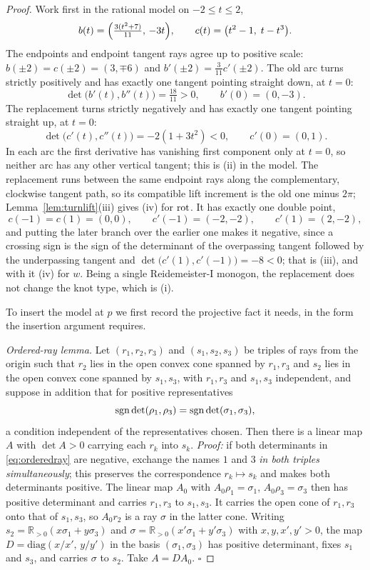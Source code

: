 \begin{proof}
Work first in the rational model on $-2\leq t\leq2$,
\[
b(t)=\Bigl(\tfrac{3(t^2+7)}{11},\,-3t\Bigr),\qquad
c(t)=\bigl(t^2-1,\;t-t^3\bigr).
\]
The endpoints and endpoint tangent rays agree up to positive scale:
$b(\pm2)=c(\pm2)=(3,\mp6)$ and $b'(\pm2)=\frac3{11}c'(\pm2)$. The old arc turns
strictly positively and has exactly one tangent pointing straight down, at
$t=0$:
\[
\det\bigl(b'(t),b''(t)\bigr)=\tfrac{18}{11}>0,\qquad b'(0)=(0,-3).
\]
The replacement turns strictly negatively and has exactly one tangent pointing
straight up, at $t=0$:
\[
\det\bigl(c'(t),c''(t)\bigr)=-2(1+3t^2)<0,\qquad c'(0)=(0,1).
\]
In each arc the first derivative has vanishing first component only at $t=0$, so
neither arc has any other vertical tangent; this is (ii) in the model. The
replacement runs between the same endpoint rays along the complementary,
clockwise tangent path, so its compatible lift increment is the old one minus
$2\pi$; Lemma~\ref{lem:turnlift}(iii) gives (iv) for $\operatorname{rot}$. It has exactly one double point,
\[
c(-1)=c(1)=(0,0),\qquad c'(-1)=(-2,-2),\qquad c'(1)=(2,-2),
\]
and putting the later branch over the earlier one makes it negative, since a
crossing sign is the sign of the determinant of the overpassing tangent followed
by the underpassing tangent and
$\det\bigl(c'(1),c'(-1)\bigr)=-8<0$; that is (iii), and with it (iv) for $w$.
Being a single Reidemeister-I monogon, the replacement does not change the knot
type, which is (i).

To insert the model at $p$ we first record the projective fact it needs, in the
form the insertion argument requires.

\emph{Ordered-ray lemma.} Let $(r_1,r_2,r_3)$ and $(s_1,s_2,s_3)$ be triples of
rays from the origin such that $r_2$ lies in the open convex cone spanned by
$r_1,r_3$ and $s_2$ lies in the open convex cone spanned by $s_1,s_3$, with
$r_1,r_3$ and $s_1,s_3$ independent, and suppose in addition that for positive
representatives
\begin{equation}
   \operatorname{sgn}\det(\rho_1,\rho_3)=\operatorname{sgn}\det(\sigma_1,\sigma_3),
\label{eq:orderedray}
\end{equation}
a condition independent of the representatives chosen. Then there is a linear
map $A$ with $\det A>0$ carrying each $r_k$ into $s_k$.
\emph{Proof:} if both determinants in \eqref{eq:orderedray} are negative,
exchange the names $1$ and $3$ \emph{in both triples simultaneously}; this
preserves the correspondence $r_k\mapsto s_k$ and makes both determinants
positive. The linear map $A_0$ with $A_0\rho_1=\sigma_1$, $A_0\rho_3=\sigma_3$
then has positive determinant and carries $r_1,r_3$ to $s_1,s_3$. It carries the
open cone of $r_1,r_3$ onto that of $s_1,s_3$, so $A_0r_2$ is a ray $\sigma$ in
the latter cone. Writing $s_2=\mathbb R_{>0}(x\sigma_1+y\sigma_3)$ and
$\sigma=\mathbb R_{>0}(x'\sigma_1+y'\sigma_3)$ with $x,y,x',y'>0$, the map
$D=\mathrm{diag}(x/x',\,y/y')$ in the basis $(\sigma_1,\sigma_3)$ has positive
determinant, fixes $s_1$ and $s_3$, and carries $\sigma$ to $s_2$. Take
$A=DA_0$. $\square$


\end{proof}
